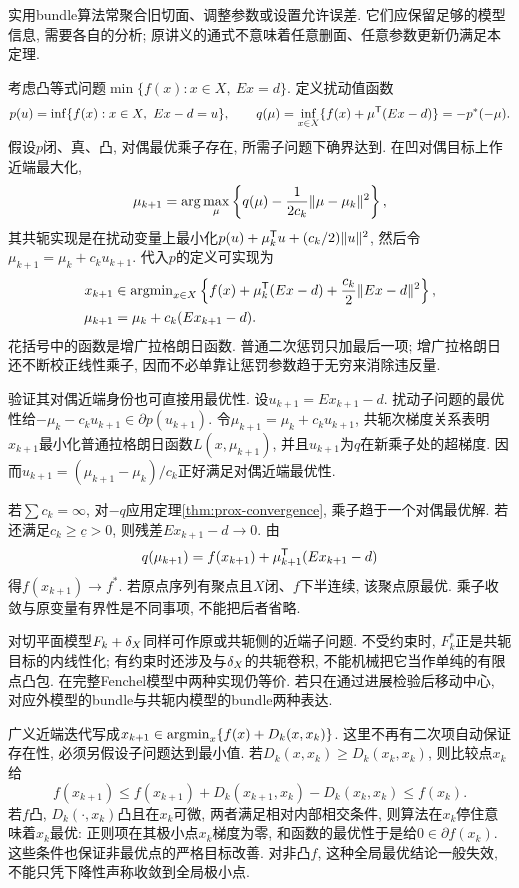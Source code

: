 实用bundle算法常聚合旧切面、调整参数或设置允许误差. 它们应保留足够的模型信息, 需要各自的分析; 原讲义的通式不意味着任意删面、任意参数更新仍满足本定理.

考虑凸等式问题$\min\{f(x):x\in X,\ Ex=d\}$. 定义扰动值函数
\[
 p(u)=\inf\{f(x):x\in X,\ Ex-d=u\},\qquad
 q(\mu)=\inf_{x\in X}\{f(x)+\mu\T(Ex-d)\}=-p^*(-\mu).
\]
假设$p$闭、真、凸, 对偶最优乘子存在, 所需子问题下确界达到. 在凹对偶目标上作近端最大化,
\[
 \mu_{k+1}=\arg\max_\mu\left\{q(\mu)-\frac1{2c_k}\lVert \mu-\mu_k\rVert^2\right\},
\]
其共轭实现是在扰动变量上最小化$p(u)+\mu_k^{\mathsf T} u+(c_k/2)\lVert u\rVert^2$, 然后令$\mu_{k+1}=\mu_k+c_k u_{k+1}$. 代入$p$的定义可实现为
\begin{equation}\label{eq:augmented-lagrangian}
 \begin{split}
 x_{k+1}&\in\operatorname{argmin}_{x\in X}\left\{f(x)+\mu_k^{\mathsf T}(Ex-d)+\frac{c_k}{2}\lVert Ex-d\rVert^2\right\},\\
 \mu_{k+1}&=\mu_k+c_k(Ex_{k+1}-d).
 \end{split}
\end{equation}
花括号中的函数是增广拉格朗日函数. 普通二次惩罚只加最后一项; 增广拉格朗日还不断校正线性乘子, 因而不必单靠让惩罚参数趋于无穷来消除违反量.

验证其对偶近端身份也可直接用最优性. 设$u_{k+1}=Ex_{k+1}-d$. 扰动子问题的最优性给$-\mu_k-c_k u_{k+1}\in\partial p(u_{k+1})$. 令$\mu_{k+1}=\mu_k+c_k u_{k+1}$, 共轭次梯度关系表明$x_{k+1}$最小化普通拉格朗日函数$L(x,\mu_{k+1})$, 并且$u_{k+1}$为$q$在新乘子处的超梯度. 因而$u_{k+1}=(\mu_{k+1}-\mu_k)/c_k$正好满足对偶近端最优性.

若$\sum c_k=\infty$, 对$-q$应用定理\ref{thm:prox-convergence}, 乘子趋于一个对偶最优解. 若还满足$c_k\ge\underline c>0$, 则残差$Ex_{k+1}-d\to0$. 由
\[
 q(\mu_{k+1})=f(x_{k+1})+\mu_{k+1}^{\mathsf T}(Ex_{k+1}-d)
\]
得$f(x_{k+1})\to f^*$. 若原点序列有聚点且$X$闭、$f$下半连续, 该聚点原最优. 乘子收敛与原变量有界性是不同事项, 不能把后者省略.

对切平面模型$F_k+\delta_{X}$同样可作原或共轭侧的近端子问题. 不受约束时, $F_k^*$正是共轭目标的内线性化; 有约束时还涉及与$\delta_{X}$的共轭卷积, 不能机械把它当作单纯的有限点凸包. 在完整Fenchel模型中两种实现仍等价. 若只在通过进展检验后移动中心, 对应外模型的bundle与共轭内模型的bundle两种表达.

广义近端迭代写成$x_{k+1}\in\operatorname{argmin}_x\{f(x)+D_k(x,x_k)\}$. 这里不再有二次项自动保证存在性, 必须另假设子问题达到最小值. 若$D_k(x,x_k)\ge D_k(x_k,x_k)$, 则比较点$x_k$给
\[
 f(x_{k+1})\le f(x_{k+1})+D_k(x_{k+1},x_k)-D_k(x_k,x_k)\le f(x_k).
\]
若$f$凸, $D_k(\cdot,x_k)$凸且在$x_k$可微, 两者满足相对内部相交条件, 则算法在$x_k$停住意味着$x_k$最优: 正则项在其极小点$x_k$梯度为零, 和函数的最优性于是给$0\in\partial f(x_k)$. 这些条件也保证非最优点的严格目标改善. 对非凸$f$, 这种全局最优结论一般失效, 不能只凭下降性声称收敛到全局极小点.

